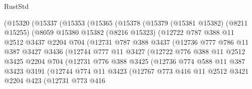 \begin{lexlean}{RustStd}
\begin{coremodule}
{\begin{coremodule}
{{{{{{{{{{{{{{{{{{{{{{{{{{{{{{{{{{{{{{{{{{{{{{{{{{          (@15320
            (@15337
              (@15353
                (@15365
                  (@15378
                    (@15379
                      (@15381 @15382)
                      (@8211 @15255)
                      (@8059
                        @15380
                        @15382
                        (@8216 @15323)
                        (@12722
                          @787
                          @388
                          @11
                          @2512
                          @3437
                          @2204
                          @704
                          (@12731
                            @787
                            @388
                            @3437
                            (@12736
                              @777
                              @786
                              @11
                              @387
                              @3427
                              @3436
                              (@12744
                                @777
                                @11
                                @3427
                                (@12722
                                  @776
                                  @388
                                  @11
                                  @2512
                                  @3425
                                  @2204
                                  @704
                                  (@12731
                                    @776
                                    @388
                                    @3425
                                    (@12736
                                      @774
                                      @588
                                      @11
                                      @387
                                      @3423
                                      @3191
                                      (@12744
                                        @774
                                        @11
                                        @3423
                                        (@12767
                                          @773
                                          @416
                                          @11
                                          @2512
                                          @3421
                                          @2204
                                          @423
                                          (@12731
                                            @773
                                            @416
}}}}}}}}}}}}}}}}}}}}}}}}}}}}}}}}}}}}}}}}}}}}}}}}}}
\end{coremodule}}
\end{coremodule}
\end{lexlean}

